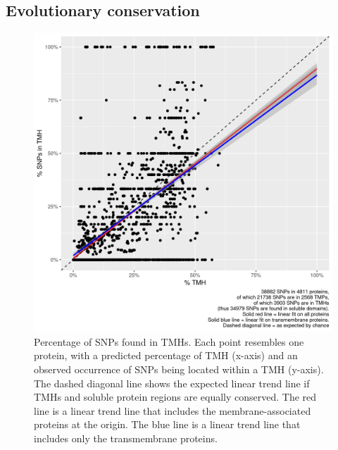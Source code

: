 \subsection{Evolutionary conservation}

\begin{figure}[!htbp]
  \includegraphics[width=\textwidth]{ncbi_peregrine_results/fig_f_snps_found_and_expected.png}
  \caption{
    Percentage of SNPs found in TMHs.
    Each point resembles one protein, with a predicted percentage of
    TMH (x-axis) and an observed occurrence of SNPs being located
    within a TMH (y-axis).
    The dashed diagonal line shows the expected linear trend line
    if TMHs and soluble protein regions are equally conserved.
    The red line is a linear trend line that includes the membrane-associated
    proteins at the origin. 
    The blue line is a linear trend line that includes only the
    transmembrane proteins.
  }
  \label{fig:f_snps_found_and_expected}
\end{figure}

